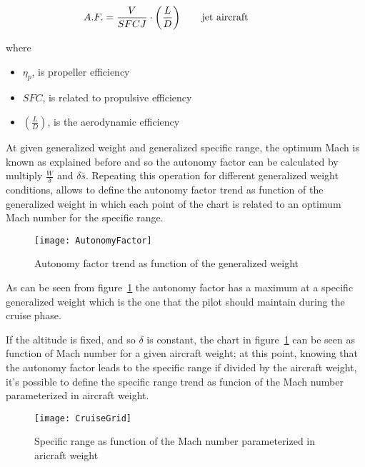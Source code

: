 \begin{eqnarray}
A.F.=\frac{V}{SFCJ}\cdot\left(\frac{L}{D}\right) %
\qquad \textrm {\parbox[t][][t]{.25\linewidth} {jet aircraft}}
\label{eqn:A.F.Equation5}
\end{eqnarray}

\noindent
where

\begin{itemize}
\item $\eta_{p}$, is propeller efficiency
\item $SFC$, is related to propulsive efficiency
\item $\left(\frac{L}{D}\right)$, is the aerodynamic efficiency
\end{itemize}

\noindent 
At given generalized weight and generalized specific range, the optimum Mach is known as explained before and so the autonomy factor can be calculated by multiply $\frac{W}{\delta}$ and $\delta\bar s$. Repeating this operation for different generalized weight conditions, allows to define the autonomy factor trend as function of the generalized weight in which each point of the chart is related to an optimum Mach number for the specific range.

\begin{figure}[t]
\centering
\texttt{[image: AutonomyFactor]}
\caption{Autonomy factor trend as function of the generalized weight}
\label{fig:Figure5}
\end{figure}

\noindent
As can be seen from figure~\ref{fig:Figure5} the autonomy factor has a maximum at a specific generalized weight which is the one that the pilot should maintain during the cruise phase. 

If the altitude is fixed, and so $\delta$ is constant, the chart in figure~\ref{fig:Figure5} can be seen as function of Mach number for a given aircraft weight; at this point, knowing that the autonomy factor leads to the specific range if divided by the aircraft weight, it's possible to define the specific range trend as funcion of the Mach number parameterized in aircraft weight. 

\begin{figure}[b]
\centering
\texttt{[image: CruiseGrid]}
\caption{Specific range as function of the Mach number parameterized in aricraft weight}
\label{fig:Figure6}
\end{figure}

